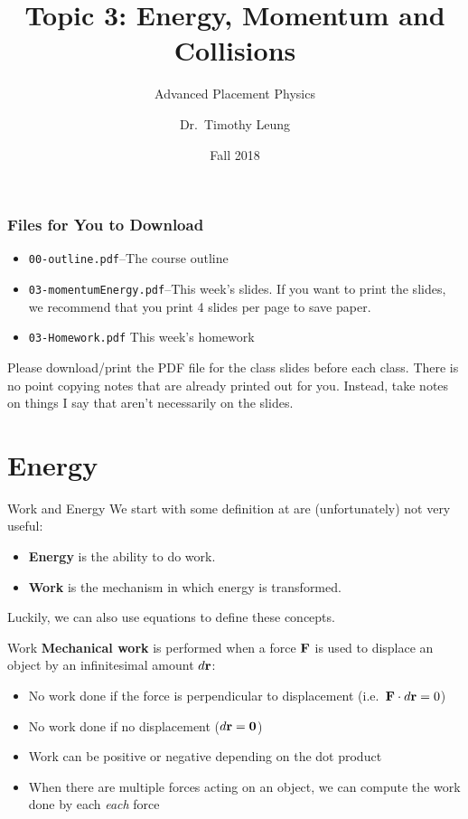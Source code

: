 \documentclass[12pt,compress,aspectratio=169]{beamer}
\title{Topic 3: Energy, Momentum and Collisions}
\subtitle{Advanced Placement Physics}
\author[TML]{Dr.\ Timothy Leung}
\institute{Olympiads School}
\date{Fall 2018}
\newcommand{\mb}[1]{\ensuremath\mathbf{#1}}
\newcommand{\eq}[2]{\vspace{#1}{\Large\begin{displaymath}#2\end{displaymath}}}
\begin{document}
\begin{frame}
  \maketitle
\end{frame}

\begin{frame}
  \frametitle{Files for You to Download}
  \begin{itemize}
  \item\texttt{00-outline.pdf}--The course outline
  \item\texttt{03-momentumEnergy.pdf}--This week's slides. If you want to
    print the slides, we recommend that you print 4 slides per page to save
    paper.
  \item\texttt{03-Homework.pdf} This week's homework
  \end{itemize}
  Please download/print the PDF file for the class slides before each class.
  There is no point copying notes that are already printed out for you.
  Instead, take notes on things I say that aren't necessarily on the slides.
\end{frame}



\section{Energy}

\begin{frame}{Work and Energy}
  We start with some definition at are (unfortunately) not very useful:
  \begin{itemize}
    \item \textbf{Energy} is the ability to do work.
    \item \textbf{Work} is the mechanism in which energy is transformed.
  \end{itemize}
  Luckily, we can also use equations to define these concepts.
\end{frame}


\begin{frame}{Work}
  \textbf{Mechanical work} is performed when a force $\mb{F}$ is used to
  displace an object by an infinitesimal amount $d\mb{r}$:

  \eq{-.2in}{
    \boxed{W=\int_{r_1}^{r_2}\mb{F}(r)\cdot d\mb{r}}
  }

  \begin{itemize}
  \item No work done if the force is perpendicular to displacement
    (i.e.\ $\mb{F}\cdot d\mb{r}=0$)
  \item No work done if no displacement ($d\mb{r}=\mb{0}$)
  \item Work can be positive or negative depending on the dot product
  \item When there are multiple forces acting on an object, we can compute the
    work done by each \emph{each} force
  \end{itemize}
\end{frame}
\end{document}
